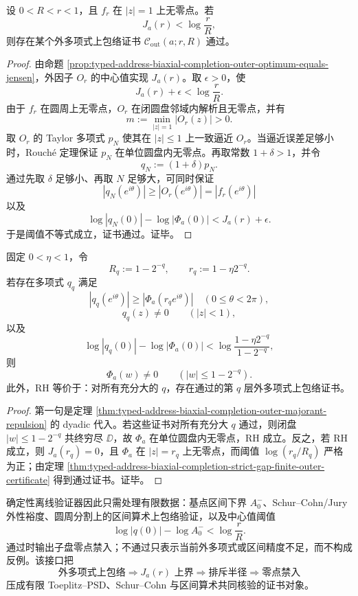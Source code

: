 \begin{theorem}[严格间隙下的有限外多项式证书存在性]\label{thm:typed-address-biaxial-completion-strict-gap-finite-outer-certificate}
设 \(0<R<r<1\)，且 \(f_r\) 在 \(|z|=1\) 上无零点。若
\[
J_a(r)<\log\frac rR,
\]
则存在某个外多项式上包络证书 \(\mathcal C_{\mathrm{out}}(a;r,R)\) 通过。
\end{theorem}
\begin{proof}
由命题 \ref{prop:typed-address-biaxial-completion-outer-optimum-equals-jensen}，外因子 \(O_r\) 的中心值实现 \(J_a(r)\)。取 \(\epsilon>0\)，使
\[
J_a(r)+\epsilon<\log\frac rR.
\]
由于 \(f_r\) 在圆周上无零点，\(O_r\) 在闭圆盘邻域内解析且无零点，并有
\[
m:=\min_{|z|=1}|O_r(z)|>0.
\]
取 \(O_r\) 的 Taylor 多项式 \(p_N\) 使其在 \(|z|\le1\) 上一致逼近 \(O_r\)。当逼近误差足够小时，Rouch\'e 定理保证 \(p_N\) 在单位圆盘内无零点。再取常数 \(1+\delta>1\)，并令
\[
q_N:=(1+\delta)p_N.
\]
通过先取 \(\delta\) 足够小、再取 \(N\) 足够大，可同时保证
\[
|q_N(e^{i\theta})|\ge |O_r(e^{i\theta})|=|f_r(e^{i\theta})|
\]
以及
\[
\log|q_N(0)|-\log|\Phi_a(0)|
<
J_a(r)+\epsilon.
\]
于是阈值不等式成立，证书通过。证毕。
\end{proof}

\begin{corollary}\label{cor:typed-address-biaxial-completion-dyadic-outer-majorant-certificate}
固定 \(0<\eta<1\)，令
\[
R_q:=1-2^{-q},
\qquad
r_q:=1-\eta2^{-q}.
\]
若存在多项式 \(q_q\) 满足
\[
|q_q(e^{i\theta})|\ge|\Phi_a(r_qe^{i\theta})|
\quad(0\le\theta<2\pi),
\]
\[
q_q(z)\ne0\qquad(|z|<1),
\]
以及
\[
\log|q_q(0)|-\log|\Phi_a(0)|
<
\log\frac{1-\eta2^{-q}}{1-2^{-q}},
\]
则
\[
\Phi_a(w)\ne0\qquad(|w|\le1-2^{-q}).
\]
此外，RH 等价于：对所有充分大的 \(q\)，存在通过的第 \(q\) 层外多项式上包络证书。
\end{corollary}
\begin{proof}
第一句是定理 \ref{thm:typed-address-biaxial-completion-outer-majorant-repulsion} 的 dyadic 代入。若这些证书对所有充分大 \(q\) 通过，则闭盘 \(|w|\le1-2^{-q}\) 共终穷尽 \(\DD\)，故 \(\Phi_a\) 在单位圆盘内无零点，RH 成立。反之，若 RH 成立，则 \(J_a(r_q)=0\)，且 \(\Phi_a\) 在 \(|z|=r_q\) 上无零点，而阈值 \(\log(r_q/R_q)\) 严格为正；由定理 \ref{thm:typed-address-biaxial-completion-strict-gap-finite-outer-certificate} 得到通过证书。证毕。
\end{proof}

确定性离线验证器因此只需处理有限数据：基点区间下界 \(A_0^-\)、Schur--Cohn/Jury 外性裕度、圆周分割上的区间算术上包络验证，以及中心值阈值
\[
\log|q(0)|-\log A_0^-<\log\frac rR.
\]
通过时输出子盘零点禁入；不通过只表示当前外多项式或区间精度不足，而不构成反例。该接口把
\[
\text{外多项式上包络}
\Longrightarrow
J_a(r)\text{ 上界}
\Longrightarrow
\text{排斥半径}
\Longrightarrow
\text{零点禁入}
\]
压成有限 Toeplitz--PSD、Schur--Cohn 与区间算术共同核验的证书对象。
